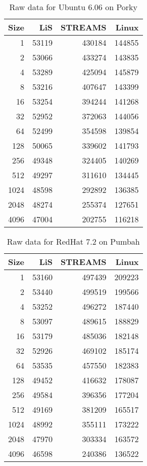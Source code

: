\documentclass[letterpaper,final,notitlepage,twocolumn,10pt,twoside]{article}
\begin{document}
\begin{appendix}
\begin{table}[hp]
\footnotesize
\center\begin{tabular}{rrrr}\\
\hline
Size & LiS & STREAMS & Linux\\
\hline
\hline
1 & 53119 & 430184 & 144855\\
2 & 53066 & 433274 & 143835\\
4 & 53289 & 425094 & 145879\\
8 & 53216 & 407647 & 143399\\
16 & 53254 & 394244 & 141268\\
32 & 52952 & 372063 & 144056\\
64 & 52499 & 354598 & 139854\\
128 & 50065 & 339602 & 141793\\
256 & 49348 & 324405 & 140269\\
512 & 49297 & 311610 & 134445\\
1024 & 48598 & 292892 & 136385\\
2048 & 48274 & 255374 & 127651\\
4096 & 47004 & 202755 & 116218\\
\hline
\end{tabular}
\caption{Raw data for Ubuntu 6.06 on Porky}
\label{table:ubuntudata}
\normalsize
\end{table}

\begin{table}[hp]
\footnotesize
\center\begin{tabular}{rrrr}\\
\hline
Size & LiS & STREAMS & Linux\\
\hline
\hline
1 & 53160 & 497439 & 209223\\
2 & 53440 & 499519 & 199566\\
4 & 53252 & 496272 & 187440\\
8 & 53097 & 489615 & 188829\\
16 & 53179 & 485036 & 182148\\
32 & 52926 & 469102 & 185174\\
64 & 53535 & 457550 & 182383\\
128 & 49452 & 416632 & 178087\\
256 & 49584 & 396356 & 177204\\
512 & 49169 & 381209 & 165517\\
1024 & 48992 & 355111 & 173222\\
2048 & 47970 & 303334 & 163572\\
4096 & 46598 & 240386 & 136522\\
\hline
\end{tabular}
\caption{Raw data for RedHat 7.2 on Pumbah}
\label{table:rh7data}
\normalsize
\end{table}


\end{appendix}
\end{document}
